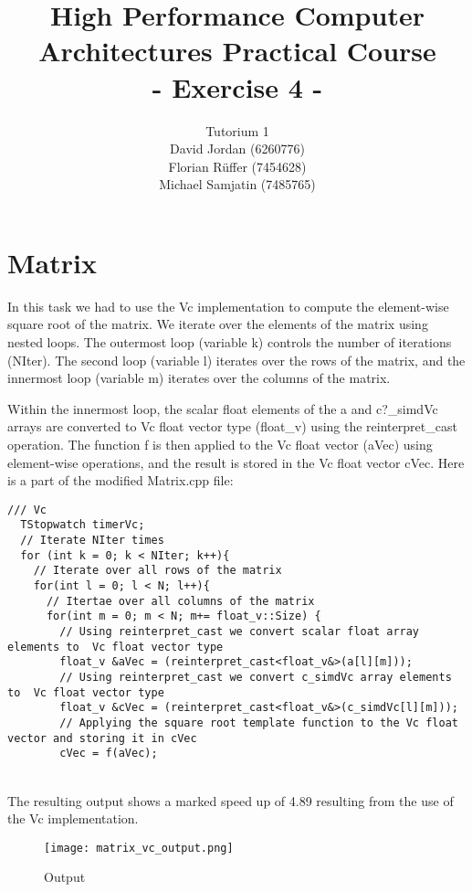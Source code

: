 \documentclass{article}
\title{\textbf{High Performance Computer Architectures Practical Course \\ - Exercise 4 -} \\[10mm]}
\author{Tutorium 1 \\[10mm] David Jordan (6260776) \\[1mm] Florian Rüffer (7454628) \\[1mm] Michael Samjatin (7485765) \\[10mm]}
\begin{document}
\maketitle
\newpage
\section{Matrix}
In this task we had to use the Vc implementation to compute the element-wise square root of the matrix. We iterate over the elements of the matrix using nested loops. The outermost loop (variable k) controls the number of iterations (NIter). The second loop (variable l) iterates over the rows of the matrix, and the innermost loop (variable m) iterates over the columns of the matrix.

Within the innermost loop, the scalar float elements of the a and c?\_simdVc arrays are converted to Vc float vector type (float\_v) using the reinterpret\_cast operation. The function f is then applied to the Vc float vector (aVec) using element-wise operations, and the result is stored in the Vc float vector cVec.
Here is a part of the modified Matrix.cpp file: 

\begin{lstlisting}[caption=Matrix.cpp]
   /// Vc
  TStopwatch timerVc; 
  // Iterate NIter times
  for (int k = 0; k < NIter; k++){
    // Iterate over all rows of the matrix
    for(int l = 0; l < N; l++){
      // Itertae over all columns of the matrix
      for(int m = 0; m < N; m+= float_v::Size) {
        // Using reinterpret_cast we convert scalar float array elements to  Vc float vector type
        float_v &aVec = (reinterpret_cast<float_v&>(a[l][m]));
        // Using reinterpret_cast we convert c_simdVc array elements to  Vc float vector type
        float_v &cVec = (reinterpret_cast<float_v&>(c_simdVc[l][m]));
        // Applying the square root template function to the Vc float  vector and storing it in cVec
        cVec = f(aVec);
\end{lstlisting} \\

The resulting output shows a marked speed up of 4.89 resulting from the use of the Vc implementation.

\begin{figure}[H]
    \centering
    \texttt{[image: matrix\_vc\_output.png]} 
    \caption{Output}
    \label{fig:example}
  \end{figure}
  
\end{document}
